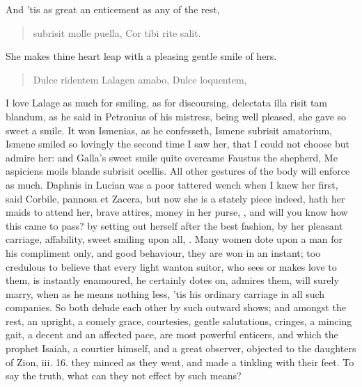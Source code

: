 And 'tis as great an enticement as any of the rest,

\begin{latin}
\begin{verse}%
subrisit molle puella,
Cor tibi rite salit.
\end{verse}%
\end{latin}

She makes thine heart leap with a pleasing gentle smile of hers.

\begin{latin}
\begin{verse}%
Dulce ridentem Lalagen amabo,
Dulce loquentem,
\end{verse}%
\end{latin}

I love Lalage as much for smiling, as for discoursing, delectata illa
risit tam blandum, as he said in Petronius of his mistress, being well
pleased, she gave so sweet a smile. It won Ismenias, as he 
confesseth, Ismene subrisit amatorium, Ismene smiled so lovingly the
second time I saw her, that I could not choose but admire her: and
Galla's sweet smile quite overcame Faustus the shepherd, Me
aspiciens moils blande subrisit ocellis. All other gestures of the body
will enforce as much. Daphnis in Lucian was a poor tattered wench
when I knew her first, said Corbile, pannosa et Zacera, but now she is
a stately piece indeed, hath her maids to attend her, brave attires,
money in her purse, \etc{}, and will you know how this came to pass? by
setting out herself after the best fashion, by her pleasant carriage,
affability, sweet smiling upon all, \etc{}. Many women dote upon a man for
his compliment only, and good behaviour, they are won in an instant;
too credulous to believe that every light wanton suitor, who sees or
makes love to them, is instantly enamoured, he certainly dotes on,
admires them, will surely marry, when as he means nothing less, 'tis
his ordinary carriage in all such companies. So both delude each other
by such outward shows; and amongst the rest, an upright, a comely
grace, courtesies, gentle salutations, cringes, a mincing gait, a
decent and an affected pace, are most powerful enticers, and which the
prophet Isaiah, a courtier himself, and a great observer, objected to
the daughters of Zion, iii. 16. they minced as they went, and made a
tinkling with their feet. To say the truth, what can they not effect by
such means?

